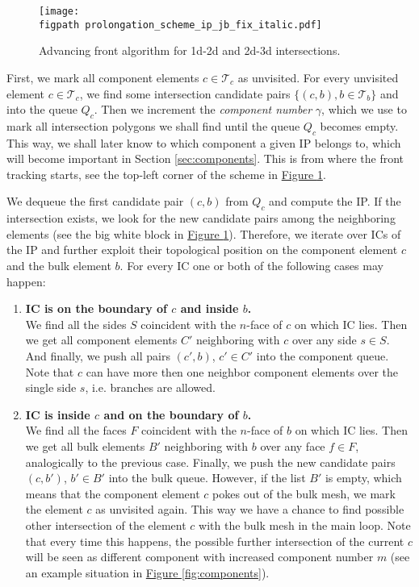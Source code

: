 \documentclass{elsarticle}
\newcommand{\fig}[1]{\hyperref[#1]{Figure \ref{#1}}}
\newcommand{\figpath}{figures/}
\newcommand{\nface}{$n$-face }
\begin{document}
%
\begin{figure}[!htb]
  \centering    
    \texttt{[image: \\figpath prolongation\_scheme\_ip\_jb\_fix\_italic.pdf]}
  \caption{Advancing front algorithm for 1d-2d and 2d-3d intersections.}
  \label{fig:prolongation}
\end{figure}

First, we mark all component elements $c\in\mathcal T_c$ as unvisited. 
For every unvisited element $c\in \mathcal T_c$, 
we find some intersection candidate pairs $\{(c,b), b\in\mathcal T_b\}$ and
into the queue $Q_c$.
Then we increment the \emph{component number} $\gamma$, which we use to 
mark all intersection polygons we shall find until the queue $Q_c$ becomes empty.
This way, we shall later know to which component a given IP belongs to, 
which will become important in Section \ref{sec:components}.
This is from where the front tracking starts, see the top-left corner of the scheme in 
\fig{fig:prolongation}.

We dequeue the first candidate pair $(c,b)$ from $Q_c$ and compute the IP.
If the intersection exists, we look for the new candidate pairs among the neighboring elements
(see the big white block in \fig{fig:prolongation}).
Therefore, we iterate over ICs of the IP and further exploit their topological position on the component element $c$ and the bulk element $b$.
For every IC one or both of the following cases may happen:
\begin{enumerate}[label=(\alph*)]
    \item \textbf{IC is on the boundary of $c$  and inside $b$.} \\
            We find all the sides $S$ coincident with the \nface of $c$ on which IC lies. Then we get all component
            elements $C'$ neighboring with $c$ over any side $s\in S$. And finally, we push all pairs $(c',b)$, $c'\in C'$ 
            into the component queue. Note that $c$ can have more then one neighbor component elements over the single side $s$, i.e. branches are allowed.
    \item \textbf{IC is inside $c$ and on the boundary of $b$.} \label{enum:prolong2}\\
            We find all the faces $F$ coincident with the \nface of $b$ on which IC lies. 
            Then we get all bulk elements $B'$ neighboring with $b$ over any face $f\in F$,
            analogically to the previous case.
            Finally, we push the new candidate pairs $(c, b')$, $b'\in B'$ into the bulk queue.
            However, if the list $B'$ is empty, which means that the component element $c$ pokes out of the bulk mesh,
            we mark the element $c$ as unvisited again. This way we have a chance to find possible other intersection of the element
            $c$ with the bulk mesh in the main loop. Note that every time this happens, the possible further intersection 
            of the current $c$ will be seen as different component with increased component number $m$
            (see an example situation in \fig{fig:components}). 
\end{enumerate}
\end{document}
